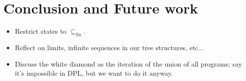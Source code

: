 \documentclass{llncs}
\begin{document}
\section{Conclusion and Future work}
\begin{itemize}
\item Restrict states to  $\subseteq_{\text{fin}}$.
\item Reflect on limits, infinite sequences in our tree structures, etc...
\item Discuss the white diamond as the iteration of the union of all programs; say it's impossible in DPL, but we want to do it anyway.
\end{itemize}



\end{document}
